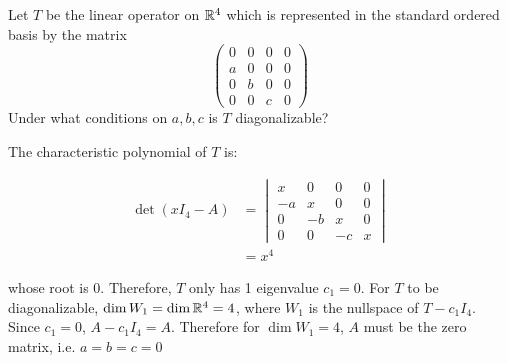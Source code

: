 \documentclass[a4paper, 10pt]{article}
\begin{document}
\begin{problem} 
Let \(T\) be the linear operator on \(\mathbb{R}^4\) which is represented in the standard ordered basis by the matrix \[
    \begin{pmatrix}
        0 & 0 & 0 & 0 \\
        a & 0 & 0 & 0 \\
        0 & b & 0 & 0 \\
        0 & 0 & c & 0
    \end{pmatrix}
\]
Under what conditions on \(a, b, c\) is \(T\) diagonalizable?
\end{problem}
\begin{solution}
    The characteristic polynomial of \(T\) is:

    \begin{align*}
        \det(xI_4 - A) & = \begin{vmatrix}
                               x  & 0  & 0  & 0 \\
                               -a & x  & 0  & 0 \\
                               0  & -b & x  & 0 \\
                               0  & 0  & -c & x
                           \end{vmatrix} \\
                       & = x^4
    \end{align*}

    whose root is 0. Therefore, \(T\) only has 1 eigenvalue \(c_1 = 0\). For \(T\) to be diagonalizable, \(\dim W_1 = \dim \mathbb{R}^4 = 4\), where \(W_1\) is the nullspace of \(T - c_1 I_4\). Since \(c_1 = 0\), \(A - c_1I_4 = A\). Therefore for \(\dim W_1 = 4\), \(A\) must be the zero matrix, i.e. \(a = b = c = 0\)
\end{solution}
\end{document}
